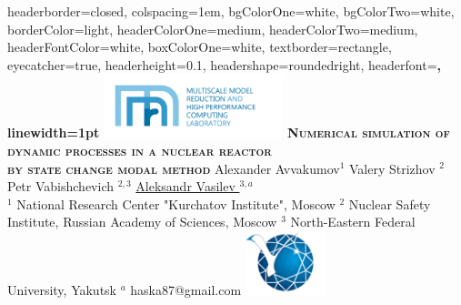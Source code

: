 \documentclass[landscape,a1paper,fontscale=0.5]{poster}
\begin{document}
\begin{poster}{
headerborder=closed, %
colspacing=1em, %
bgColorOne=white, %
bgColorTwo=white, %
borderColor=light, %
headerColorOne=medium, %
headerColorTwo=medium, %
headerFontColor=white, %
boxColorOne=white, %
textborder=rectangle, %
eyecatcher=true, %
headerheight=0.1\textheight, %
headershape=roundedright, %
headerfont=\Large\bf\textsc, %
linewidth=1pt %
}
{\includegraphics[height=5em]{mmr-text.png}}
{\bf\textsc{Numerical simulation of dynamic processes in a nuclear reactor \\ \vspace{0.2em} by state change modal method}}
{Alexander Avvakumov$^1$ \quad Valery Strizhov $^2$ \quad Petr Vabishchevich $^{2,3}$ \quad \underline{Aleksandr Vasilev $^{3,a}$} \\
\normalsize{$^1$ National Research Center "Kurchatov Institute", Moscow \quad
$^2$ Nuclear Safety Institute, Russian Academy of Sciences, Moscow \quad
$^3$ North-Eastern Federal University, Yakutsk \quad
$^a$ haska87@gmail.com}}
{\includegraphics[height=5em]{logoNEFU.png}}


\end{poster}
\end{document}
